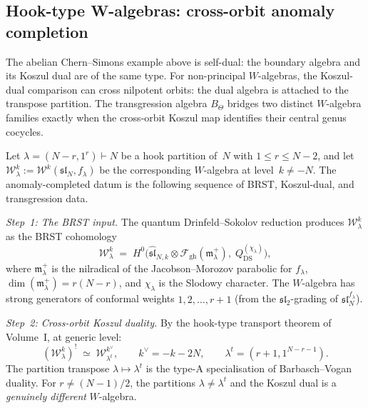 \subsection{Hook-type W-algebras: cross-orbit anomaly completion}
\label{subsec:tholog-hook-type}

The abelian Chern--Simons example above is self-dual: the boundary
algebra and its Koszul dual are of the same type. For non-principal
$W$-algebras, the Koszul-dual comparison can cross nilpotent orbits:
the dual algebra is attached to the transpose partition. The
transgression algebra $B_\Theta$ bridges two distinct $W$-algebra
families exactly when the cross-orbit Koszul map identifies their
central genus cocycles.

\begin{construction}
\label{constr:hook-type-anomaly-datum}
Let $\lambda=(N{-}r,1^r)\vdash N$ be a hook partition of~$N$
with $1\le r\le N{-}2$, and let $\mathcal W_\lambda^k
:= \mathcal W^k(\mathfrak{sl}_N,f_\lambda)$ be the corresponding
$W$-algebra at level~$k\neq -N$. The anomaly-completed datum is the
following sequence of BRST, Koszul-dual, and transgression data.

\emph{Step~1: The BRST input.}
The quantum Drinfeld--Sokolov reduction produces
$\mathcal W_\lambda^k$ as the BRST cohomology
\[
\mathcal W_\lambda^k
\;=\;
H^0\!\bigl(
\widehat{\mathfrak{sl}}_{N,k}
\otimes
\mathcal F_{\mathrm{gh}}(\mathfrak m^+_\lambda),\;
Q_{\mathrm{DS}}^{(\chi_\lambda)}
\bigr),
\]
where $\mathfrak m^+_\lambda$ is the nilradical of the
Jacobson--Morozov parabolic for $f_\lambda$,
$\dim(\mathfrak m^+_\lambda)=r(N{-}r)$, and $\chi_\lambda$
is the Slodowy character. The $W$-algebra has strong generators
of conformal weights $1,2,\dots,r{+}1$ (from the
$\mathfrak{sl}_2$-grading of
$\mathfrak{sl}_N^{f_\lambda}$).

\emph{Step~2: Cross-orbit Koszul duality.}
By the hook-type transport theorem
of Volume~I,
at generic level:
\begin{equation}\label{eq:hook-koszul-duality}
(\mathcal W_\lambda^k)^!
\;\simeq\;
\mathcal W_{\lambda^t}^{k^\vee},
\qquad
k^\vee=-k-2N,
\qquad
\lambda^t=(r{+}1,1^{N{-}r{-}1}).
\end{equation}
The partition transpose $\lambda\mapsto\lambda^t$ is the type-A
specialisation of Barbasch--Vogan duality. For $r\neq(N{-}1)/2$,
the partitions $\lambda\neq\lambda^t$ and the Koszul dual is a
\emph{genuinely different} $W$-algebra.


\end{construction}
